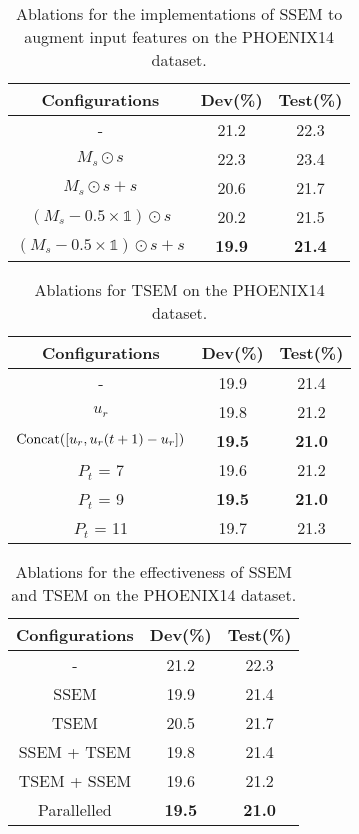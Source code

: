 \documentclass[letterpaper]{article} \usepackage{aaai23}  \usepackage{times}  \usepackage{helvet}  \usepackage{courier}  \usepackage[hyphens]{url}  \usepackage{graphicx} \urlstyle{rm} \def\UrlFont{\rm}  \usepackage{natbib}  \usepackage{caption} \frenchspacing  \setlength{\pdfpagewidth}{8.5in} \setlength{\pdfpageheight}{11in} \usepackage{algorithm}
\begin{document}
  \begin{table}[t]   
    \centering
    \begin{tabular}{ccc}
    \hline
    Configurations & Dev(\%) & Test(\%)\\
    \hline
    - & 21.2 & 22.3\\
    $M_s \odot s$  & 22.3  & 23.4 \\
    $M_s \odot s + s$ & 20.6 & 21.7 \\
    $(M_s -0.5\times \mathds{1}) \odot s$ & 20.2  & 21.5 \\
    $(M_s -0.5\times \mathds{1}) \odot s +s $ & \textbf{19.9}  & \textbf{21.4}\\
    \hline
    \end{tabular}
    \caption{Ablations for the implementations of SSEM to augment input features on the PHOENIX14 dataset.} 
    \label{tab3} 
    \end{table}

\begin{table}[t]   
  \centering
  \begin{tabular}{ccc}
  \hline
  Configurations & Dev(\%) & Test(\%)\\
  \hline
  - & 19.9 & 21.4 \\
  \hline
  $u_r$ & 19.8  & 21.2 \\
  ${\rm Concat}([u_r, u_r(t+1)-u_r])$ & \textbf{19.5}  & \textbf{21.0} \\
  \hline
  $P_t$ = 7 & 19.6  & 21.2 \\
  $P_t$ = 9 & \textbf{19.5} & \textbf{21.0} \\
  $P_t$ = 11 & 19.7  & 21.3 \\
  \hline
  \end{tabular}
  \caption{Ablations for TSEM on the PHOENIX14 dataset.} 
  \label{tab4} 
  \end{table}

\begin{table}[t]   
  \centering
  \begin{tabular}{ccc}
  \hline
  Configurations & Dev(\%) & Test(\%)\\
  \hline
  - & 21.2 & 22.3\\
  SSEM  & 19.9  & 21.4\\
  TSEM & 20.5 & 21.7 \\
  SSEM + TSEM & 19.8  & 21.4 \\
  TSEM + SSEM & 19.6  & 21.2 \\
  Parallelled & \textbf{19.5}  & \textbf{21.0} \\
  \hline
  \end{tabular}
  \caption{Ablations for the effectiveness of SSEM and TSEM on the PHOENIX14 dataset.} 
  \label{tab5} 
  \end{table}
\end{document}
